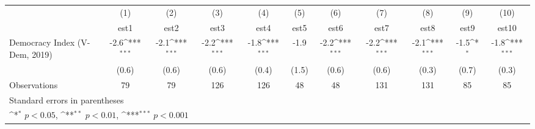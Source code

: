 {
\def\sym#1{\ifmmode^{#1}\else\(^{#1}\)\fi}
\begin{tabular}{l*{10}{c}}
\hline\hline
                    &\multicolumn{1}{c}{(1)}         &\multicolumn{1}{c}{(2)}         &\multicolumn{1}{c}{(3)}         &\multicolumn{1}{c}{(4)}         &\multicolumn{1}{c}{(5)}         &\multicolumn{1}{c}{(6)}         &\multicolumn{1}{c}{(7)}         &\multicolumn{1}{c}{(8)}         &\multicolumn{1}{c}{(9)}         &\multicolumn{1}{c}{(10)}         \\
                    &        est1         &        est2         &        est3         &        est4         &        est5         &        est6         &        est7         &        est8         &        est9         &       est10         \\
\hline
Democracy Index (V-Dem, 2019)&        -2.6\sym{***}&        -2.1\sym{***}&        -2.2\sym{***}&        -1.8\sym{***}&        -1.9         &        -2.2\sym{***}&        -2.2\sym{***}&        -2.1\sym{***}&        -1.5\sym{*}  &        -1.8\sym{***}\\
                    &       (0.6)         &       (0.6)         &       (0.6)         &       (0.4)         &       (1.5)         &       (0.6)         &       (0.6)         &       (0.3)         &       (0.7)         &       (0.3)         \\
\hline
Observations        &          79         &          79         &         126         &         126         &          48         &          48         &         131         &         131         &          85         &          85         \\
\hline\hline
\multicolumn{11}{l}{\footnotesize Standard errors in parentheses}\\
\multicolumn{11}{l}{\footnotesize \sym{*} \(p<0.05\), \sym{**} \(p<0.01\), \sym{***} \(p<0.001\)}\\
\end{tabular}
}

